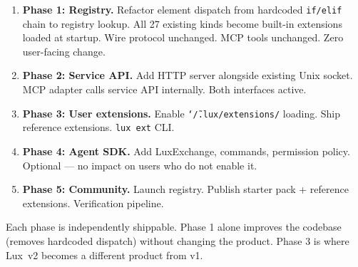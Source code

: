 \documentclass[a4paper,10pt]{article}
\begin{document}
\begin{enumerate}
  \item \textbf{Phase 1: Registry.}  Refactor element dispatch from
    hardcoded \texttt{if/elif} chain to registry lookup.  All 27
    existing kinds become built-in extensions loaded at startup.
    Wire protocol unchanged.  MCP tools unchanged.  Zero user-facing
    change.
  \item \textbf{Phase 2: Service API.}  Add HTTP server alongside
    existing Unix socket.  MCP adapter calls service API internally.
    Both interfaces active.
  \item \textbf{Phase 3: User extensions.}  Enable
    \texttt{\char`\~/.lux/extensions/} loading.  Ship reference
    extensions.  \texttt{lux ext} CLI.
  \item \textbf{Phase 4: Agent SDK.}  Add LuxExchange, commands,
    permission policy.  Optional --- no impact on users who do not
    enable it.
  \item \textbf{Phase 5: Community.}  Launch registry.  Publish
    starter pack + reference extensions.  Verification pipeline.
\end{enumerate}

Each phase is independently shippable.  Phase 1 alone improves
the codebase (removes hardcoded dispatch) without changing the
product.  Phase 3 is where Lux~v2 becomes a different product
from v1.
\end{document}
